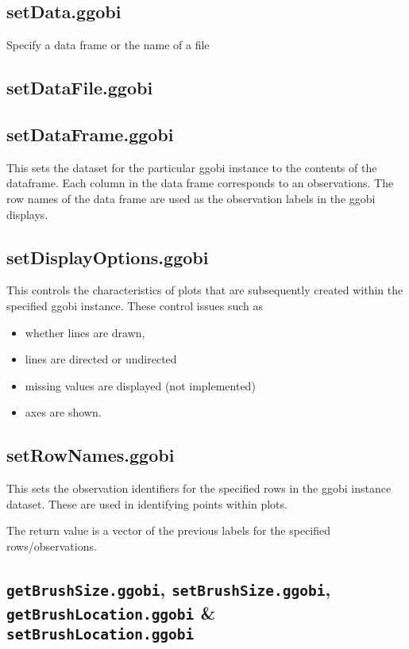 \documentclass{article}
\def\SFunction#1{{\texttt{\red #1}}}
\begin{document}
\subsection{setData.ggobi}
Specify a data frame or the name of a file

\subsection{setDataFile.ggobi}
\subsection{setDataFrame.ggobi}
This sets the dataset for the particular ggobi instance to the
contents of the dataframe.  Each column in the data frame corresponds
to an observations. The row names of the data frame are used as the
observation labels in the ggobi displays.

\subsection{setDisplayOptions.ggobi}
This controls the characteristics
of plots that are subsequently
created within the specified ggobi instance.
These control issues such as 
\begin{itemize}
\item whether lines are drawn, 
\item lines are directed or undirected
\item missing values are displayed (not implemented)  
\item axes are shown.
\end{itemize}

\subsection{setRowNames.ggobi}
This sets the observation identifiers for the 
specified rows in the ggobi instance dataset.
These are used in identifying points within 
plots.

The return value is a vector of the previous labels for the
specified rows/observations.



\subsection{\SFunction{getBrushSize.ggobi},
\SFunction{setBrushSize.ggobi},
\SFunction{getBrushLocation.ggobi} \&
\SFunction{setBrushLocation.ggobi}}
\end{document}
